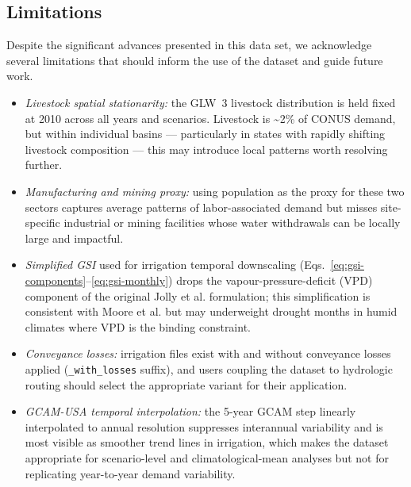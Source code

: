 \documentclass[fleqn,10pt]{wlscirep}
\begin{document}

\subsection*{Limitations}

Despite the significant advances presented in this data set, we acknowledge several limitations that should inform the use of the dataset and guide future work.
\begin{itemize}
    \item \emph{Livestock spatial stationarity:} the GLW~3 livestock distribution is held fixed at 2010 across all years and scenarios. Livestock is \textasciitilde2\% of CONUS demand, but within individual basins --- particularly in states with rapidly shifting livestock composition --- this may introduce local patterns worth resolving further. 
    \item \emph{Manufacturing and mining proxy:} using population as the proxy for these two sectors captures average patterns of labor-associated demand but misses site-specific industrial or mining facilities whose water withdrawals can be locally large and impactful.
    \item \emph{Simplified GSI} used for irrigation temporal downscaling (Eqs.~\ref{eq:gsi-components}--\ref{eq:gsi-monthly}) drops the vapour-pressure-deficit (VPD) component of the original Jolly et al.\cite{Jolly_2005} formulation; this simplification is consistent with Moore et al.\cite{Moore_2015} but may underweight drought months in humid climates where VPD is the binding constraint. 
    \item \emph{Conveyance losses:} irrigation files exist with and without conveyance losses applied (\texttt{\_with\_losses} suffix), and users coupling the dataset to hydrologic routing should select the appropriate variant for their application. 
    \item \emph{GCAM-USA temporal interpolation:} the 5-year GCAM step linearly interpolated to annual resolution suppresses interannual variability and is most visible as smoother trend lines in irrigation, which makes the dataset appropriate for scenario-level and climatological-mean analyses but not for replicating year-to-year demand variability.
\end{itemize}
\end{document}
